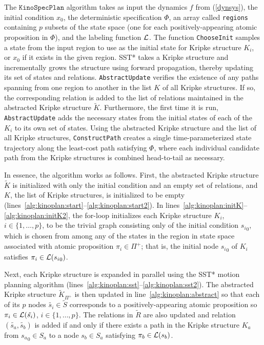 The $\texttt{KinoSpecPlan}$ algorithm takes as input the dynamics $f$ from (\ref{dynsys}), the initial condition $x_0$, the deterministic \mucalc{} specification $\Phi$, an array called \texttt{regions} containing $p$ subsets of the state space (one for each positively-appearing atomic proposition in $\Phi$), and the labeling function $\mathcal{L}$. The function \texttt{ChooseInit} samples a state from the input region to use as the initial state for Kripke structure $K_i$, or $x_0$ if it exists in the given region. SST* takes a Kripke structure and incrementally grows the structure using forward propagation, thereby updating its set of states and relations. \texttt{AbstractUpdate} verifies the existence of any paths spanning from one region to another in the list $K$ of all Kripke structures. If so, the corresponding relation is added to the list of relations maintained in the abstracted Kripke structure $\tilde{K}$. Furthermore, the first time it is run, \texttt{AbstractUpdate} adds the necessary states from the initial states of each of the $K_i$ to its own set of states. Using the abstracted Kripke structure and the list of all Kripke structures, \texttt{ConstructPath} creates a single time-parameterized state trajectory along the least-cost path satisfying $\Phi$, where each individual candidate path from the Kripke structures is combined head-to-tail as necessary. 

In essence, the algorithm works as follows. First, the abstracted Kripke structure $\tilde{K}$ is initialized with only the initial condition and an empty set of relations, and $K$, the list of Kripke structures, is initialized to be empty (lines~\ref{alg:kinoplan:start}--\ref{alg:kinoplan:start2}). In lines~\ref{alg:kinoplan:initK}--\ref{alg:kinoplan:initK2}, the for-loop initializes each Kripke structure $K_i$, $i \in \{ 1,\ldots,p \}$, to be the trivial graph consisting only of the initial condition ${s_i}_0$, which is chosen from among any of the states in the region in state space associated with atomic proposition $\pi_i \in \Pi^+$; that is, the initial node ${s_i}_0$ of $K_i$ satisfies $\pi_i \in \mathcal{L}({s_i}_0)$.

Next, each Kripke structure is expanded in parallel using the SST* motion planning algorithm (lines~\ref{alg:kinoplan:sst}--\ref{alg:kinoplan:sst2}). The abstracted Kripke structure $\tilde{K}_{\Pi^+}$ is then updated in line~\ref{alg:kinoplan:abstract} so that each of its $p$ nodes $\tilde{s_i} \in \tilde{S}$ corresponds to a positively-appearing atomic proposition so $\pi_i \in \mathcal{L}(\tilde{s_i})$, $i \in \{ 1, \ldots, p \}$. The relations in $\tilde{R}$ are also updated and relation $(\tilde{s_a}, \tilde{s_b})$ is added if and only if there exists a path in the Kripke structure $K_a$ from ${s_a}_0 \in S_a$ to a node ${s_b} \in S_a$ satisfying $\pi_b \in \mathcal{L}(s_b)$.

